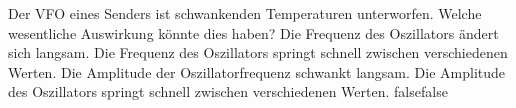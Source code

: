     {Der VFO eines Senders ist schwankenden Temperaturen unterworfen. Welche wesentliche Auswirkung könnte dies haben?}
    {Die Frequenz des Oszillators ändert sich langsam.}
    {Die Frequenz des Oszillators springt schnell zwischen verschiedenen Werten. }
    {Die Amplitude der Oszillatorfrequenz schwankt langsam.}
    {Die Amplitude des Oszillators springt schnell zwischen verschiedenen Werten. }
    {false}{false}